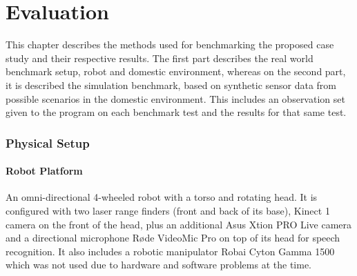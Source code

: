 
\chapter{Evaluation}
\label{chapter:results}

This chapter describes the methods used for benchmarking the proposed case study
and their respective results.
The first part describes the real world benchmark setup, robot and domestic environment, whereas
on the second part, it is described the simulation benchmark, based on synthetic sensor data from
possible scenarios in the domestic environment. This includes an observation set given to the program 
on each benchmark test and the results for that same test.

\subsection{Physical Setup}

\subsubsection{Robot Platform}
An omni-directional 4-wheeled robot with a torso and rotating head. It is configured with 
two laser range finders (front and back of its base), Kinect 1 camera on the front of the head, 
plus an additional Asus Xtion PRO Live camera
and a directional microphone R{\o}de VideoMic Pro on top of its head for speech recognition. It also
includes a robotic manipulator Robai Cyton Gamma 1500 which was not used due to hardware and software 
problems at the time.

